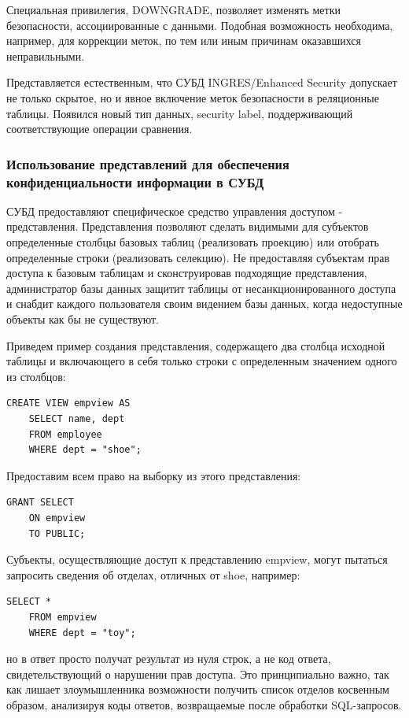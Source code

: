 Специальная привилегия, DOWNGRADE, позволяет изменять метки безопасности, ассоциированные с
данными. Подобная возможность необходима, например, для коррекции меток, по тем или иным причинам
оказавшихся неправильными.

Представляется естественным, что СУБД INGRES/Enhanced Security допускает не только скрытое, но и
явное включение меток безопасности в реляционные таблицы. Появился новый тип данных, security
label, поддерживающий соответствующие операции сравнения.


\subsubsection{Использование представлений для обеспечения конфиденциальности информации в СУБД}

СУБД предоставляют специфическое средство управления доступом - представления. Представления
позволяют сделать видимыми для субъектов определенные столбцы базовых таблиц (реализовать проекцию)
или отобрать определенные строки (реализовать селекцию). Не предоставляя субъектам прав доступа к
базовым таблицам и сконструировав подходящие представления, администратор базы данных защитит
таблицы от несанкционированного доступа и снабдит каждого пользователя своим видением базы данных,
когда недоступные объекты как бы не существуют.

Приведем пример создания представления, содержащего два столбца исходной таблицы и включающего в
себя только строки с определенным значением одного из столбцов:
\begin{lstlisting}[]
    CREATE VIEW empview AS
    SELECT name, dept
    FROM employee
    WHERE dept = "shoe";
\end{lstlisting}

Предоставим всем право на выборку из этого представления:
\begin{lstlisting}[]
    GRANT SELECT
    ON empview
    TO PUBLIC;
\end{lstlisting}

Субъекты, осуществляющие доступ к представлению empview, могут пытаться запросить сведения об
отделах, отличных от shoe, например:
\begin{lstlisting}[]
    SELECT *
    FROM empview
    WHERE dept = "toy";
\end{lstlisting}

но в ответ просто получат результат из нуля строк, а не код ответа, свидетельствующий о нарушении
прав доступа. Это принципиально важно, так как лишает злоумышленника возможности получить список
отделов косвенным образом, анализируя коды ответов, возвращаемые после обработки SQL-запросов.



